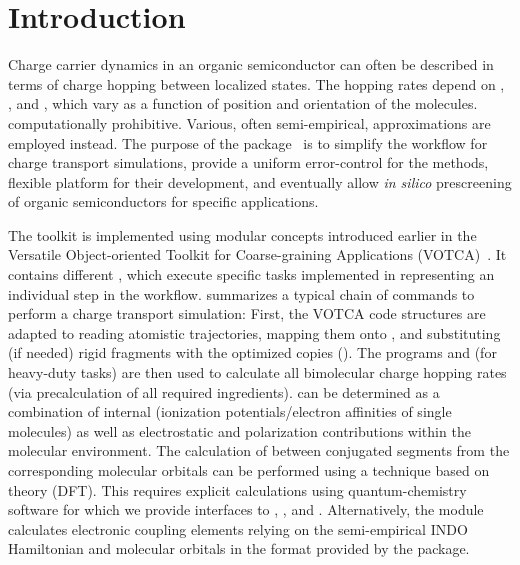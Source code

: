 \chapter{Introduction}
\label{sec:introduction}

Charge carrier dynamics in an organic semiconductor can often be described in 
terms of charge hopping between localized states. The hopping rates depend on 
, 
, and 
, which vary as a function of position 
and orientation of the molecules. 
computationally prohibitive. Various, often semi-empirical, approximations are 
employed instead. 
The purpose of the \votcaxtp package~\cite{ruhle_microscopic_2011} is to 
simplify the workflow for charge transport simulations, provide a uniform 
error-control for the methods, flexible platform for their development, and 
eventually allow {\em in silico} prescreening of organic semiconductors for 
specific applications. 

The toolkit is implemented using modular concepts introduced earlier in the 
Versatile Object-oriented Toolkit for Coarse-graining Applications 
(VOTCA)~\cite{ruhle_versatile_2009}. It contains different 
, which execute specific tasks implemented in 
 representing an individual step in the 
workflow.  summarizes a typical chain of commands to perform a 
charge transport simulation:   
%
First, the VOTCA code structures are adap\-ted to reading atomistic 
trajectories, mapping them onto , and substituting (if needed) rigid fragments with the optimized 
copies (\xtpmap). The programs \xtprun and \xtpparallel (for heavy-duty tasks) 
are then used to calculate all bimolecular charge hopping rates (via 
precalculation of all required ingredients).  can be determined as a combination of internal 
(ionization potentials/electron affinities of single molecules) as well as 
electrostatic and polarization contributions within the molecular environment. 
The calculation of  
between conjugated segments from the corresponding molecular orbitals can be 
performed using a  technique based on 
 theory (DFT). This requires explicit 
calculations using quantum-chemistry software for which we provide interfaces to 
\gaussian, \orca, and \nwchem. Alternatively, the 
 module calculates electronic 
coupling elements relying on the semi-empirical INDO Hamiltonian and molecular 
orbitals in the format provided by the \gaussian package. 

